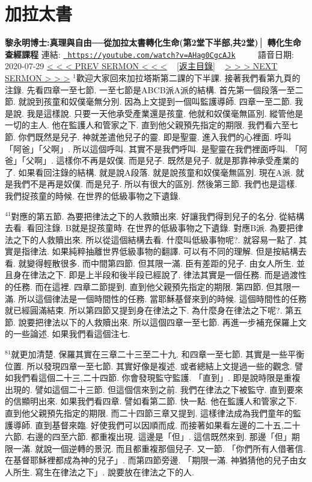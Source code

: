 \documentclass{book}
\begin{document}
\section{加拉太書}
\label{sec:AHag0CgcAJk}
\textbf{黎永明博士:真理與自由──從加拉太書轉化生命(第2堂下半部,共2堂)│ 轉化生命查經課程}
\newline
\newline
連結: \href{https://youtube.com/watch?v=AHag0CgcAJk}{\texttt{ https://youtube.com/watch?v=AHag0CgcAJk}} ~~~~ 語音日期: 2020-07-29 
\newline
\newline
\hyperref[sec:rE4H78OZeSY]{\small{< < < PREV SERMON < < <}}
~
\hyperref[sec:index]{\small{[返主目錄]}}
~
\hyperref[sec:IJzVofjZ8RU]{\small{> > > NEXT SERMON > > >}}
\newline
\newline
$^{1}$歡迎大家回來加拉塔斯第二課的下半課.
接著我們看第九頁的注錄.
先看四章一至七節.
一至七節是ABCB派A派的結構.
首先第一個段落一至二節.
就說到孩童和奴僕毫無分別.
因為上文提到一個叫監護導師.
四章一至二節.
我是說.
我是這樣說.
只要一天他承受產業還是孩童.
他就和奴僕毫無區別.
縱管他是一切的主人.
他在監護人和管家之下.
直到他父親預先指定的期限.
我們看六至七節.
你們既然是兒子.
神就差遣他兒子的靈.
即是聖靈.
進入我們的心裡面.
呼叫「阿爸」「父啊」.
所以這個呼叫.
其實不是我們呼叫.
是聖靈在我們裡面呼叫.
「阿爸」「父啊」.
這樣你不再是奴僕.
而是兒子.
既然是兒子.
就是那靠神承受產業的了.
如果看回注錄的結構.
就是說A段落.
就是說孩童和奴僕毫無區別.
現在A派.
就是我們不是再是奴僕.
而是兒子.
所以有很大的區別.
然後第三節.
我們也是這樣.
我們捉孩童的時候.
在世界的低級事物之下遺錄.

$^{41}$對應的第五節.
為要把律法之下的人救贖出來.
好讓我們得到兒子的名分.
從結構去看.
看回注錄.
B就是捉孩童時.
在世界的低級事物之下遺錄.
對應B派.
為要把律法之下的人救贖出來.
所以從這個結構去看.
什麼叫低級事物呢?.
就容易一點了.
其實是指律法.
如果純粹抽離世界低級事物的翻譯.
可以有不同的理解.
但是按結構去看.
就變得輕散很多.
而中間第四節.
但其限一滿.
臣有差距的兒子.
由女人所生.
並且身在律法之下.
即是上半段和後半段已經說了.
律法其實是一個任務.
而是過渡性的任務.
而在這裡.
四章二節提到.
直到他父親預先指定的期限.
第四節.
但其限一滿.
所以這個律法是一個時間性的任務.
當耶穌基督來到的時候.
這個時間性的任務就已經圓滿結束.
所以第四節又提到身在律法之下.
為什麼身在律法之下呢?.
第五節.
說要把律法以下的人救贖出來.
所以這個四章一至七節.
再進一步補充保羅上文的一些論述.
如果我們看這個注七.

$^{81}$就更加清楚.
保羅其實在三章二十三至二十九.
和四章一至七節.
其實是一些平衡位置.
所以發現四章一至七節.
其實好像是複述.
或者總結上文提過一些的觀念.
譬如我們看這個二十三,二十四節.
你會發現監守監護.
「直到」.
即是說時限是重複出現的.
譬如這個二十三節.
但這個信來到之前.
我們在律法之下被監守.
直到要來的信顯明出來.
如果我們看四章.
譬如看第二節.
快一點.
他在監護人和管家之下.
直到他父親預先指定的期限.
而二十四節三章又提到.
這樣律法成為我們童年的監護導師.
直到基督來臨.
好使我們可以因順而成.
而接著如果看左邊的二十五,二十六節.
右邊的四至六節.
都重複出現.
這邊是「但」.
這信既然來到.
那邊「但」期限一滿.
就說一個逆轉的景況.
而且都重複那個兒子.
又一節.
「你們所有人借著信.
在基督耶穌裡都成為神的兒子」.
而第四節旁邊.
「期限一滿.
神猶猜他的兒子由女人所生.
寫生在律法之下」.
說要放在律法之下的人.
\end{document}
